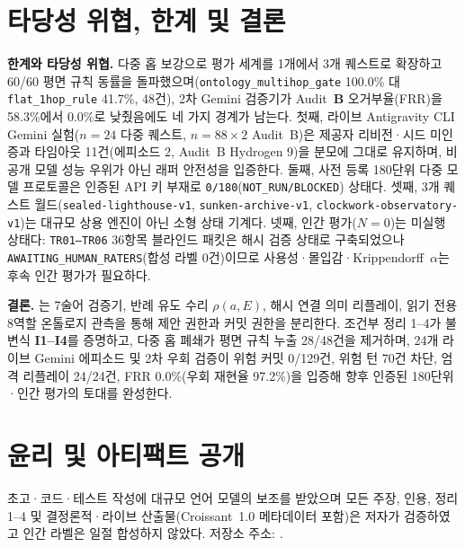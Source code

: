 \FloatBarrier
\section{타당성 위협, 한계 및 결론}\label{sec:conclusion}
\textbf{한계와 타당성 위협.} 다중 홉 보강으로 평가 세계를 1개에서 3개 퀘스트로 확장하고 60/60 평면 규칙 동률을 돌파했으며(\texttt{ontology\_}\allowbreak\texttt{multihop\_}\allowbreak\texttt{gate} 100.0\% 대 \texttt{flat\_}\allowbreak\texttt{1hop\_}\allowbreak\texttt{rule} 41.7\%, 48건), 2차 Gemini 검증기가 Audit~\textbf{B} 오거부율(FRR)을 58.3\%에서 0.0\%로 낮췄음에도 네 가지 경계가 남는다. 첫째, 라이브 Antigravity CLI Gemini 실험($n{=}24$ 다중 퀘스트, $n{=}88{\times}2$ Audit~B)은 제공자 리비전·시드 미인증과 타임아웃 11건(에피소드 2, Audit~B Hydrogen 9)을 분모에 그대로 유지하며, 비공개 모델 성능 우위가 아닌 래퍼 안전성을 입증한다. 둘째, 사전 등록 180단위 다중 모델 프로토콜은 인증된 API 키 부재로 \texttt{0/180}(\texttt{NOT\_RUN/BLOCKED}) 상태다. 셋째, 3개 퀘스트 월드(\texttt{sealed-}\allowbreak\texttt{lighthouse-}\allowbreak\texttt{v1}, \texttt{sunken-}\allowbreak\texttt{archive-}\allowbreak\texttt{v1}, \texttt{clockwork-}\allowbreak\texttt{observatory-}\allowbreak\texttt{v1})는 대규모 상용 엔진이 아닌 소형 상태 기계다. 넷째, 인간 평가($N{=}0$)는 미실행 상태다: \texttt{TR01--TR06} 36항목 블라인드 패킷은 해시 검증 상태로 구축되었으나 \texttt{AWAITING\_}\allowbreak\texttt{HUMAN\_}\allowbreak\texttt{RATERS}(합성 라벨 0건)이므로 사용성·몰입감·Krippendorff~$\alpha$는 후속 인간 평가가 필요하다.

\textbf{결론.} \system{}는 7술어 검증기, 반례 유도 수리 $\rho(a,E)$, 해시 연결 의미 리플레이, 읽기 전용 8역할 온톨로지 관측을 통해 제안 권한과 커밋 권한을 분리한다. 조건부 정리 1--4가 불변식 \textbf{I1--I4}를 증명하고, 다중 홉 폐쇄가 평면 규칙 누출 28/48건을 제거하며, 24개 라이브 Gemini 에피소드 및 2차 우회 검증이 위험 커밋 0/129건, 위험 턴 70건 차단, 엄격 리플레이 24/24건, FRR 0.0\%(우회 재현율 97.2\%)을 입증해 향후 인증된 180단위·인간 평가의 토대를 완성한다.

\section*{윤리 및 아티팩트 공개}
초고·코드·테스트 작성에 대규모 언어 모델의 보조를 받았으며 모든 주장, 인용, 정리 1--4 및 결정론적·라이브 산출물(Croissant~1.0 메타데이터 포함)은 저자가 검증하였고 인간 라벨은 일절 합성하지 않았다. 저장소 주소: \RepoURL.

